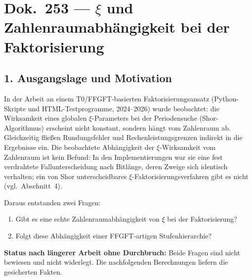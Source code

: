 \section*{Dok.\ 253 — \texorpdfstring{$\xi$}{xi} und Zahlenraumabhängigkeit bei der Faktorisierung}

\begin{abstract}
Arbeitsdokument. Zweck: Sicherung der Ergebnisse einer längeren Untersuchung
ohne Durchbruch. Untersucht wurde die Frage, ob der FFGFT-Parameter
$\xi = 4/30000$ bei der Faktorisierung zusammengesetzter Zahlen eine
Zahlenraumabhängigkeit zeigt und ob diese einer FFGFT-Stufenhierarchie folgt.
Alle Berechnungen wurden mit Python verifiziert. Die Verbindung zu FFGFT bleibt
Vermutung ohne algebraischen Brückenbeweis.
\end{abstract}

\subsection*{1. Ausgangslage und Motivation}

In der Arbeit an einem T0/FFGFT-basierten Faktorisierungsansatz (Python-Skripte
und HTML-Testprogramme, 2024--2026) wurde beobachtet: die Wirksamkeit eines
globalen $\xi$-Parameters bei der Periodensuche (Shor-Algorithmus) erscheint
nicht konstant, sondern hängt vom Zahlenraum ab. Gleichzeitig fließen
Rundungsfehler und Rechenleistungsgrenzen indirekt in die Ergebnisse ein.
Die beobachtete Abhängigkeit der $\xi$-Wirksamkeit vom Zahlenraum ist kein
Befund: In den Implementierungen war sie eine fest verdrahtete
Fallunterscheidung nach Bitlänge, deren Zweige sich identisch verhalten;
ein von Shor unterscheidbares $\xi$-Faktorisierungsverfahren gibt es nicht
(vgl.\ Abschnitt~4).

Daraus entstanden zwei Fragen:

\begin{enumerate}
\item Gibt es eine echte Zahlenraumabhängigkeit von $\xi$ bei der Faktorisierung?
\item Folgt diese Abhängigkeit einer FFGFT-artigen Stufenhierarchie?
\end{enumerate}

\begin{mdframed}[style=warn]
\textbf{Status nach längerer Arbeit ohne Durchbruch:} Beide Fragen sind nicht
bewiesen und nicht widerlegt. Die nachfolgenden Berechnungen liefern die
gesicherten Fakten.
\end{mdframed}

